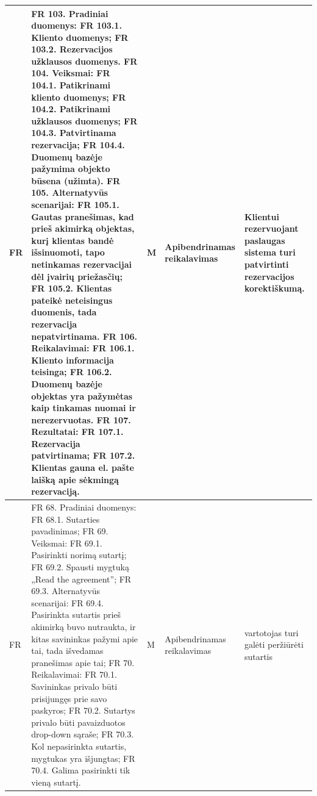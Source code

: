 \documentclass[oneside]{VUMIFPSkursinis}
\begin{document}
\begin{longtable}{ | p{}|p{}|p{}|p{}|p{}| }
FR & 
FR 103. Pradiniai duomenys: 
FR 103.1. Kliento duomenys;
 FR 103.2. Rezervacijos užklausos duomenys.
 FR 104. Veiksmai: 
FR 104.1. Patikrinami kliento duomenys;
 FR 104.2. Patikrinami užklausos duomenys;
 FR 104.3. Patvirtinama rezervacija; 
FR 104.4. Duomenų bazėje pažymima objekto būsena (užimta). 
FR 105. Alternatyvūs scenarijai:
 FR 105.1. Gautas pranešimas, kad prieš akimirką objektas, kurį klientas bandė išsinuomoti, tapo netinkamas rezervacijai dėl įvairių priežasčių;
 FR 105.2. Klientas pateikė neteisingus duomenis, tada rezervacija nepatvirtinama. 
FR 106. Reikalavimai: FR 106.1. Kliento informacija teisinga;
 FR 106.2. Duomenų bazėje objektas yra pažymėtas kaip tinkamas nuomai ir nerezervuotas.
 FR 107. Rezultatai: 
FR 107.1. Rezervacija patvirtinama;
 FR 107.2. Klientas gauna el. pašte laišką apie sėkmingą rezervaciją.
& M &Apibendrinamas reikalavimas & 
Klientui rezervuojant paslaugas sistema turi patvirtinti rezervacijos korektiškumą. \\ \hline
FR&
FR 68. Pradiniai duomenys:
FR 68.1. Sutarties pavadinimas;
FR 69. Veiksmai:
FR 69.1. Pasirinkti norimą sutartį;
FR 69.2. Spausti mygtuką „Read the agreement”;
FR 69.3. Alternatyvūs scenarijai:
FR 69.4. Pasirinkta sutartis prieš akimirką buvo nutraukta, ir kitas savininkas pažymi apie tai, tada išvedamas pranešimas apie tai;
FR 70. Reikalavimai:
FR 70.1. Savininkas privalo būti prisijungęs prie savo paskyros;
FR 70.2. Sutartys privalo būti pavaizduotos drop-down sąraše;
FR 70.3. Kol nepasirinkta sutartis, mygtukas yra išjungtas;
FR 70.4. Galima pasirinkti tik vieną sutartį. & M & Apibendrinamas reikalavimas & vartotojas turi galėti peržiūrėti sutartis \\ \hline



\end{longtable}
\end{document}
